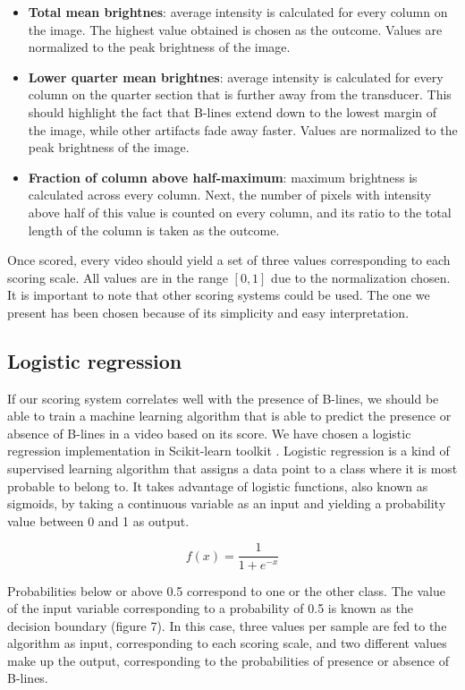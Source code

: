 \documentclass[12pt]{article} %
\begin{document}
\begin{itemize}
	\item \textbf{Total mean brightnes}: average intensity is calculated for every column on the image. The highest value obtained is chosen as the outcome. Values are normalized to the peak brightness of the image.
	\item \textbf{Lower quarter mean brightnes}: average intensity is calculated for every column on the quarter section that is further away from the transducer. This should highlight the fact that B-lines extend down to the lowest margin of the image, while other artifacts fade away faster. Values are normalized to the peak brightness of the image.
	\item \textbf{Fraction of column above half-maximum}: maximum brightness is calculated across every column. Next, the number of pixels with intensity above half of this value is counted on every column, and its ratio to the total length of the column is taken as the outcome. 
\end{itemize}

Once scored, every video should yield a set of three values corresponding to each scoring scale. All values are in the range $[0,1]$ due to the normalization chosen. It is important to note that other scoring systems could be used. The one we present has been chosen because of its simplicity and easy interpretation.

\subsection{Logistic regression}

	If our scoring system correlates well with the presence of B-lines, we should be able to train a machine learning algorithm that is able to predict the presence or absence of B-lines in a video based on its score. We have chosen a logistic regression implementation in Scikit-learn toolkit \cite{sklearn}. Logistic regression is a kind of supervised learning algorithm that assigns a data point to a class where it is most probable to belong to. It takes advantage of logistic functions, also known as sigmoids, by taking a continuous variable as an input and yielding a probability value between 0 and 1 as output. 

	\[ f(x) = \frac{1}{1+ e^{-x}} \]
	
	Probabilities below or above 0.5 correspond to one or the other class. The value of the input variable corresponding to a probability of 0.5 is known as the decision boundary (figure 7). In this case, three values per sample are fed to the algorithm as input, corresponding to each scoring scale, and two different values make up the output, corresponding to the probabilities of presence or absence of B-lines.
	
\end{document}
